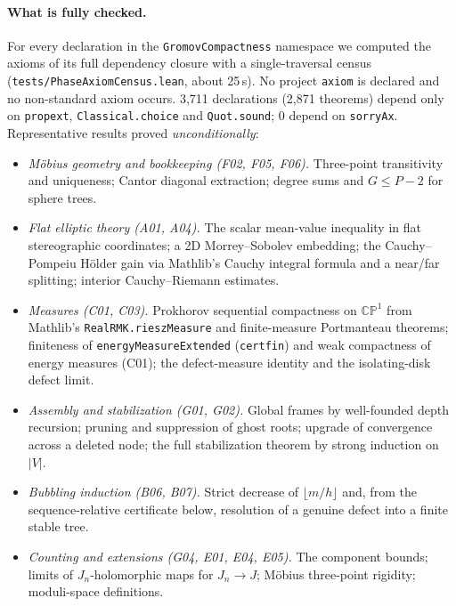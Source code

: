 \documentclass[11pt]{article}
\renewcommand{\_}{\origus\allowbreak}
\newcommand{\CP}{\mathbb{CP}^1}
\newcommand{\code}[1]{\texttt{#1}}
\newcommand{\NdeclClean}{3{,}711}
\newcommand{\NdeclSorry}{0}
\newcommand{\NthmClean}{2{,}871}
\begin{document}
\paragraph{What is fully checked.}
For every declaration in the \code{GromovCompactness} namespace we computed the axioms of its full
dependency closure with a single-traversal census (\code{tests/PhaseAxiomCensus.lean}, about
25\,s). No project \code{axiom} is declared and no non-standard axiom occurs. \NdeclClean{}
declarations (\NthmClean{} theorems) depend only on \code{propext}, \code{Classical.choice} and
\code{Quot.sound}; \NdeclSorry{} depend on \code{sorryAx}. Representative results proved
\emph{unconditionally}:
\begin{itemize}
\item \emph{M\"obius geometry and bookkeeping (F02, F05, F06).} Three-point transitivity and
  uniqueness; Cantor diagonal extraction; degree sums and $G\le P-2$ for sphere trees.
\item \emph{Flat elliptic theory (A01, A04).} The scalar mean-value inequality in flat
  stereographic coordinates; a 2D Morrey--Sobolev embedding; the Cauchy--Pompeiu H\"older gain via
  Mathlib's Cauchy integral formula and a near/far splitting; interior Cauchy--Riemann estimates.
\item \emph{Measures (C01, C03).} Prokhorov sequential compactness on $\CP$ from Mathlib's
  \code{RealRMK.rieszMeasure} and finite-measure Portmanteau theorems; finiteness of
  \code{energyMeasureExtended} (\code{cert\_fin}) and weak compactness of energy measures (C01);
  the defect-measure identity and the isolating-disk defect limit.
\item \emph{Assembly and stabilization (G01, G02).} Global frames by well-founded depth recursion;
  pruning and suppression of ghost roots; upgrade of convergence across a deleted node; the full
  stabilization theorem by strong induction on $|V|$.
\item \emph{Bubbling induction (B06, B07).} Strict decrease of $\lfloor m/h\rfloor$ and, from the
  sequence-relative certificate below, resolution of a genuine defect into a finite stable tree.
\item \emph{Counting and extensions (G04, E01, E04, E05).} The component bounds; limits of
  $J_n$-holomorphic maps for $J_n\to J$; M\"obius three-point rigidity; moduli-space definitions.
\end{itemize}
\end{document}

